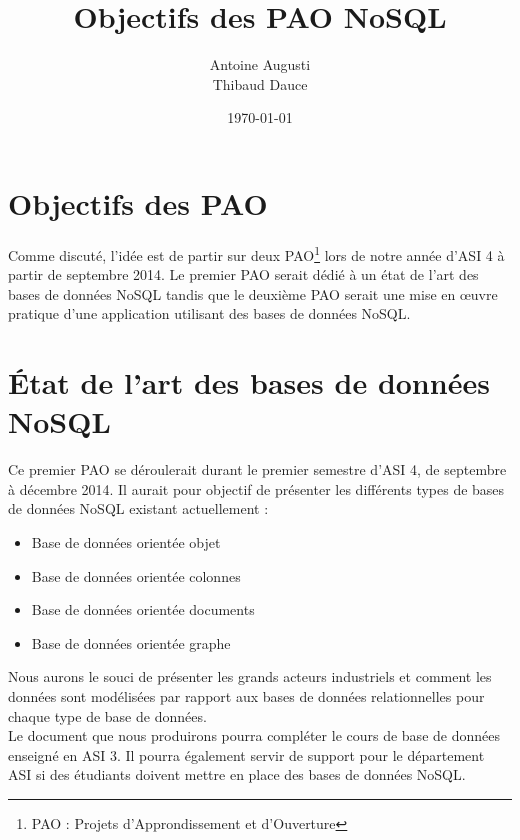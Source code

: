 \documentclass[a4paper, 12pt, french]{article}
\title{Objectifs des PAO NoSQL}
\author{Antoine Augusti\\ Thibaud Dauce}
\date{\today}
\begin{document}
	\maketitle

	\section{Objectifs des PAO}
	Comme discuté, l'idée est de partir sur deux PAO\footnote{PAO : Projets d'Approndissement et d'Ouverture} lors de notre année d'ASI 4 à partir de septembre 2014. Le premier PAO serait dédié à un état de l'art des bases de données NoSQL tandis que le deuxième PAO serait une mise en œuvre pratique d'une application utilisant des bases de données NoSQL.

	\section{État de l'art des bases de données NoSQL}
	Ce premier PAO se déroulerait durant le premier semestre d'ASI 4, de septembre à décembre 2014. Il aurait pour objectif de présenter les différents types de bases de données NoSQL existant actuellement :
	\vspace{10px}
	\begin{itemize}
		\item Base de données orientée objet
		\item Base de données orientée colonnes
		\item Base de données orientée documents
		\item Base de données orientée graphe
	\end{itemize}
	\vspace{10px}

	Nous aurons le souci de présenter les grands acteurs industriels et comment les données sont modélisées par rapport aux bases de données relationnelles pour chaque type de base de données.\\

	Le document que nous produirons pourra compléter le cours de base de données enseigné en ASI 3. Il pourra également servir de support pour le département ASI si des étudiants doivent mettre en place des bases de données NoSQL.
\end{document}
